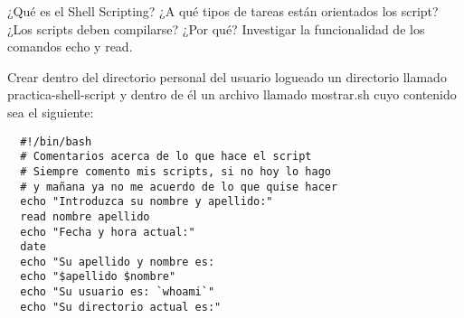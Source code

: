 
\begin{questions}
\question ¿Qué es el Shell Scripting? ¿A qué tipos de tareas están orientados los script? ¿Los scripts deben compilarse? ¿Por qué?
\question Investigar la funcionalidad de los comandos echo y read. 

\item Crear dentro del directorio personal del usuario logueado un directorio llamado practica-shell-script y dentro de él un archivo llamado mostrar.sh cuyo contenido sea el siguiente:

\begin{verbatim}  
  #!/bin/bash
  # Comentarios acerca de lo que hace el script
  # Siempre comento mis scripts, si no hoy lo hago
  # y mañana ya no me acuerdo de lo que quise hacer
  echo "Introduzca su nombre y apellido:"
  read nombre apellido
  echo "Fecha y hora actual:"
  date
  echo "Su apellido y nombre es:
  echo "$apellido $nombre"
  echo "Su usuario es: `whoami`"
  echo "Su directorio actual es:"
\end{verbatim}  
\end{questions}
